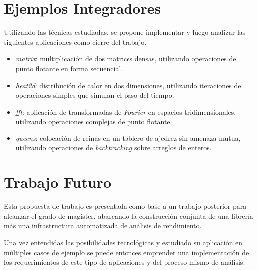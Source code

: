 \documentclass[a4paper]{article}
\begin{document}
\section{Ejemplos Integradores}

Utilizando las t\'ecnicas estudiadas, se propone implementar y luego analizar
las siguientes aplicaciones como cierre del trabajo.

\begin{itemize}

\item \emph{matrix}: multiplicaci\'on de dos matrices densas, utilizando
  operaciones de punto flotante en forma secuencial.

\item \emph{heat2d}: distribuci\'on de calor en dos dimensiones, utilizando
  iteraciones de operaciones simples que simulan el paso del tiempo.

\item \emph{fft}: aplicaci\'on de transformadas de {\it Fourier} en espacios
  tridimensionales, utilizando operaciones complejas de punto flotante.

\item \emph{queens}: colocaci\'on de reinas en un tablero de ajedrez sin
  amenaza mutua, utilizando operaciones de {\it backtracking} sobre arreglos
  de enteros.

\end{itemize}

\section{Trabajo Futuro}

Esta propuesta de trabajo es presentada como base a un trabajo posterior para
alcanzar el grado de magister, abarcando la construcci\'on conjunta de una
librer\'ia m\'as una infrastructura automatizada de an\'alisis de rendimiento.

\smallskip

Una vez entendidas las posibilidades tecnol\'ogicas y estudiado su
aplicaci\'on en m\'ultiples casos de ejemplo se puede entonces emprender una
implementaci\'on de los requerimientos de este tipo de aplicaciones y del
proceso mismo de an\'alisis.
\end{document}
